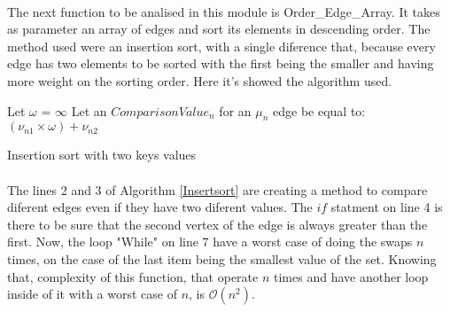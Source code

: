 \documentclass[titlepage]{article}
\begin{document}
        \paragraph{}
        The next function to be analised in this module is Order\_Edge\_Array. It takes as parameter an array of edges and sort its elements in descending order. The method used were an insertion sort, with a single diference that, because every edge has two elements to be sorted with the first being the smaller and having more weight on the sorting order. Here it's showed the algorithm used.
        \begin{algorithm}[h]
            Let $\omega$ = $\infty$\;
            Let an $ComparisonValue_n$ for an $\mu_n$ edge be equal to:
            $(\nu_{n1} \times \omega) + \nu_{n2}$\;
            \SetAlgoLined
            \caption{Insertion sort with two keys values\label{Insertsort}}
        \end{algorithm}
    \paragraph{}
    The lines 2 and 3 of Algorithm \ref{Insertsort} are creating a method to compare diferent edges even if they have two diferent values. The $if$ statment on line 4 is there to be sure that the second vertex of the edge is always greater than the first. Now, the loop "While" on line 7 have a worst case of doing the swaps $n$ times, on the case of the last item being the smallest value of the set. Knowing that, complexity of this function, that operate $n$ times and have another loop inside of it with a worst case of $n$, is $\mathcal{O}(n^2)$.
\end{document}
